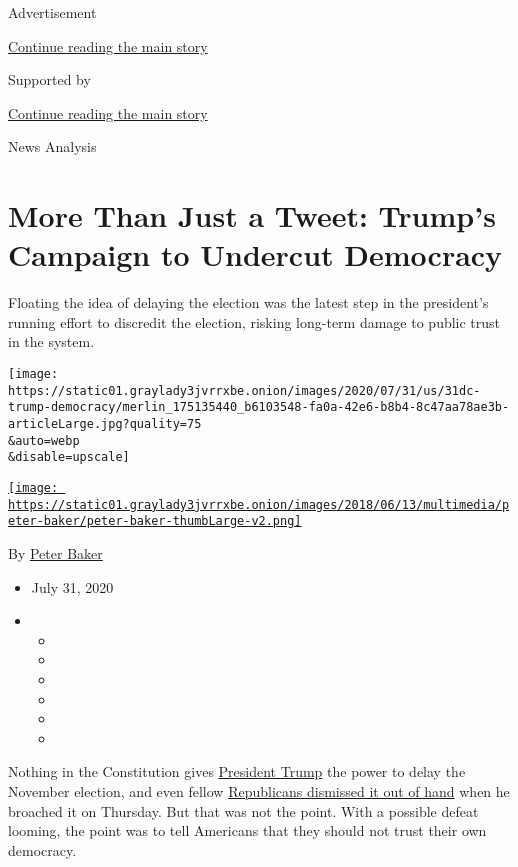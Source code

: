 Advertisement

\protect\hyperlink{after-top}{Continue reading the main story}

Supported by

\protect\hyperlink{after-sponsor}{Continue reading the main story}

News Analysis

\hypertarget{more-than-just-a-tweet-trumps-campaign-to-undercut-democracy}{%
\section{More Than Just a Tweet: Trump's Campaign to Undercut
Democracy}\label{more-than-just-a-tweet-trumps-campaign-to-undercut-democracy}}

Floating the idea of delaying the election was the latest step in the
president's running effort to discredit the election, risking long-term
damage to public trust in the system.

\texttt{[image: https://static01.graylady3jvrrxbe.onion/images/2020/07/31/us/31dc-trump-democracy/merlin\_175135440\_b6103548-fa0a-42e6-b8b4-8c47aa78ae3b-articleLarge.jpg?quality=75\\\&auto=webp\\\&disable=upscale]}

\href{https://www.nytimes3xbfgragh.onion/by/peter-baker}{\texttt{[image: https://static01.graylady3jvrrxbe.onion/images/2018/06/13/multimedia/peter-baker/peter-baker-thumbLarge-v2.png]}}

By \href{https://www.nytimes3xbfgragh.onion/by/peter-baker}{Peter Baker}

\begin{itemize}
\item
  July 31, 2020
\item
  \begin{itemize}
  \item
  \item
  \item
  \item
  \item
  \item
  \end{itemize}
\end{itemize}

Nothing in the Constitution gives
\href{https://www.nytimes3xbfgragh.onion/2020/08/23/technology/twitter-trump-tweet-warning.html}{President
Trump} the power to delay the November election, and even fellow
\href{https://www.nytimes3xbfgragh.onion/2020/07/30/us/politics/trump-delay-2020-election.html?action=click\&module=Top\%20Stories\&pgtype=Homepage}{Republicans
dismissed it out of hand} when he broached it on Thursday. But that was
not the point. With a possible defeat looming, the point was to tell
Americans that they should not trust their own democracy.

